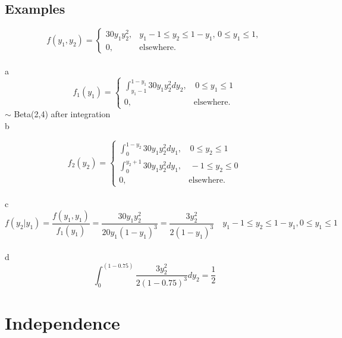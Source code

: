 \documentclass{report}
\begin{document}
\subsection[Examples]{Examples}
\[
f(y_1, y_2) =
\begin{cases} 
30y_1 y_2^2, & y_1 - 1 \leq y_2 \leq 1 - y_1, \, 0 \leq y_1 \leq 1, \\
0, & \text{elsewhere}.
\end{cases}
\] 
\sol
\\ 
a \quad 
\[
f_1(y_1) = 
\begin{cases}
	\int_{y_1 - 1}^{1-y_1}30y_1y_{2}^{2}dy_2, & \, 0 \leq y_1 \leq 1 \\
	0, & \text{elsewhere}.
\end{cases}
\]
$\sim$ Beta(2,4) after integration \\
b \quad 

\[
f_2(y_2) = 
\begin{cases}
	\int_{0}^{1-y_2}30y_1y_{2}^{2}dy_1, & \, 0 \leq y_2 \leq 1 \\
	\int_{0}^{y_2+1}30y_1y_{2}^{2}dy_1, & \, -1 \leq y_2 \leq 0  \\
	0, & \text{elsewhere}.
\end{cases}
\]
\\
c \quad
$$f(y_2|y_1) = \frac{f(y_1,y_1)}{f_1(y_1)} = \frac{30y_1y_2^2}{20y_1(1-y_1)^3} = \frac{3y_2^2}{2(1-y_1)^3} \quad y_1 -1 \leq y_2 \leq 1-y_1, 0 \leq y_1 \leq 1$$
\\
d \quad 
$$\int_{0}^{(1-0.75)}\frac{3y_2^2}{2(1-0.75)^3}dy_2 = \frac{1}{2}	$$
\section{Independence}
\end{document}
